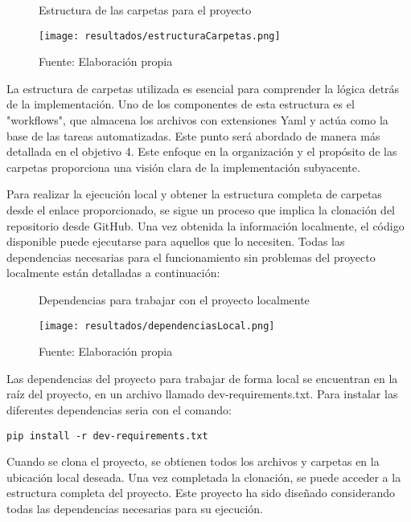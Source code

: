 \begin{figure}[h]
\centering
\caption{Estructura de las carpetas para el proyecto}
\texttt{[image: resultados/estructuraCarpetas.png]}
\caption*{\footnotesize Fuente: Elaboración propia}
\label{fig:figuraEstructuraCarpetas}
\end{figure}

La estructura de carpetas utilizada es esencial para comprender la lógica detrás de la implementación. Uno de los componentes de esta estructura es el "workflows", que almacena los archivos con extensiones Yaml y actúa como la base de las tareas automatizadas. Este punto será abordado de manera más detallada en el objetivo 4. Este enfoque en la organización y el propósito de las carpetas proporciona una visión clara de la implementación subyacente.

\newpage

Para realizar la ejecución local y obtener la estructura completa de carpetas desde el enlace proporcionado, se sigue un proceso que implica la clonación del repositorio desde GitHub. Una vez obtenida la información localmente, el código disponible puede ejecutarse para aquellos que lo necesiten. Todas las dependencias necesarias para el funcionamiento sin problemas del proyecto localmente están detalladas a continuación:


\begin{figure}[h]
\centering
\caption{Dependencias para trabajar con el proyecto localmente}
\texttt{[image: resultados/dependenciasLocal.png]}
\caption*{\footnotesize Fuente: Elaboración propia}
\label{fig:figuraDependenciasLocal}
\end{figure}

\newpage

Las dependencias del proyecto para trabajar de forma local se encuentran en la raíz del proyecto, en un archivo llamado dev-requirements.txt. Para instalar las diferentes dependencias seria con el comando: 
\begin{verbatim}
pip install -r dev-requirements.txt
\end{verbatim}

Cuando se clona el proyecto, se obtienen todos los archivos y carpetas en la ubicación local deseada. Una vez completada la clonación, se puede acceder a la estructura completa del proyecto. Este proyecto ha sido diseñado considerando todas las dependencias necesarias para su ejecución. \newline

